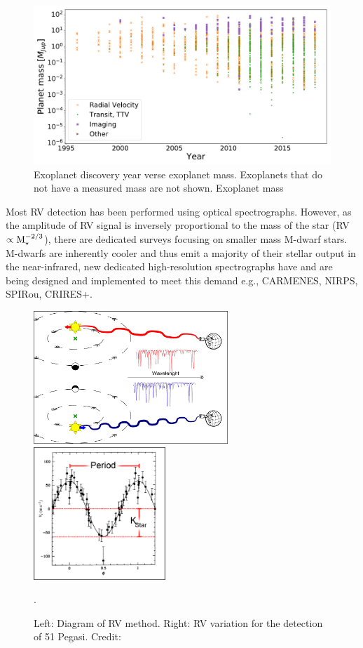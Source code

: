 \begin{figure}
    \includegraphics[width=0.5\linewidth]{figures/introduction/exoplanetEU_year_mass.pdf}
    \caption{Exoplanet discovery year verse exoplanet mass. Exoplanets that do not have a measured mass are not shown. Exoplanet mass }
    \label{fig:exoplaneteuyearmass}
\end{figure}

Most {RV} detection has been performed using optical spectrographs.
However, as the amplitude of {RV} signal is inversely proportional to the mass of the star (RV $\propto \textrm{M}_{\star}^{-2/3}$), there are dedicated surveys focusing on smaller mass M-dwarf stars\citep[e.g.]{reiners_carmenes_2018}.
M-dwarfs are inherently cooler and thus emit a majority of their stellar output in the near-infrared, new dedicated high-resolution \nir{} spectrographs have and are being designed and implemented to meet this demand e.g., {CARMENES}, {NIRPS}, {SPIRou}, {CRIRES+}.

\begin{figure}
    \centering
        \includegraphics[height=5cm]{./figures/introduction/RV_Diagram}
    \includegraphics[height=5cm]{./figures/introduction/PhaseFolded_51Pegb_Mayor_et_al_1995}
    \caption{Left: Diagram of {RV} method. Right: {RV} variation for the detection of {51 Pegasi}. Credit:~\citet{mayor_jupitermass_1995}}.
    \label{fig:rvdiagram-mayor}
\end{figure}


